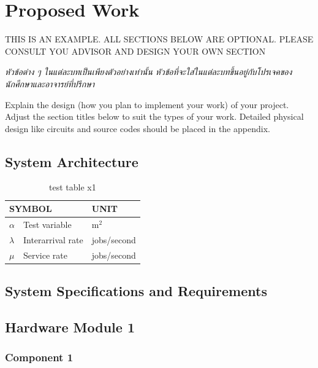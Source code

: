 \documentclass[12pt,oneside,openright,a4paper]{cpe-english-project}
\begin{document}
\chapter{Proposed Work}


THIS IS AN EXAMPLE. ALL SECTIONS BELOW ARE OPTIONAL. PLEASE CONSULT YOU ADVISOR AND DESIGN YOUR OWN SECTION

\emph{\textthai{หัวข้อต่าง ๆ ในแต่ละบทเป็นเพียงตัวอย่างเท่านั้น หัวข้อที่จะใส่ในแต่ละบทขึ้นอยู่กับโปรเจคของนักศึกษาและอาจารย์ที่ปรึกษา}}


Explain the design (how you plan to implement your work) of your project. Adjust the section titles below to suit the types of your work. Detailed physical design like circuits and source codes should be placed in the appendix.

\section{System Architecture}

\begin{table}[!h]
\centering
\caption{test table x1}\label{tbl:symbols}
\begin{tabular}{@{}p{}|p{}p{}}\hline
\multicolumn{2}{l}{\textbf{SYMBOL}}  & \textbf{UNIT} \\ \hline 
$\alpha$ & Test variable\hfill & m$^2$ \\
$\lambda$ & Interarrival rate\hfill &  jobs/second\\
$\mu$ & Service rate\hfill & jobs/second \\ \hline
\end{tabular}
\end{table}

\section{System Specifications and Requirements}

\section{Hardware Module 1}
\subsection{Component 1}
\end{document}
